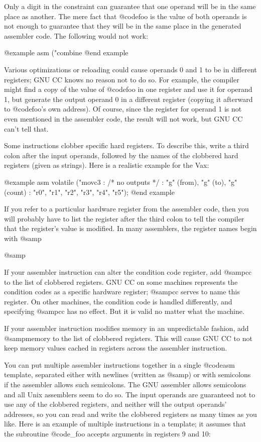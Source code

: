 {Only a digit in the constraint can guarantee that one operand will be in
the same place as another.  The mere fact that @code{foo} is the value of
both operands is not enough to guarantee that they will be in the same
place in the generated assembler code.  The following would not work:

@example
asm ("combine %
@end example

Various optimizations or reloading could cause operands 0 and 1 to be in
different registers; GNU CC knows no reason not to do so.  For example, the
compiler might find a copy of the value of @code{foo} in one register and
use it for operand 1, but generate the output operand 0 in a different
register (copying it afterward to @code{foo}'s own address).  Of course,
since the register for operand 1 is not even mentioned in the assembler
code, the result will not work, but GNU CC can't tell that.

Some instructions clobber specific hard registers.  To describe this, write
a third colon after the input operands, followed by the names of the
clobbered hard registers (given as strings).  Here is a realistic example
for the Vax:

@example
asm volatile ("movc3 %
              : /* no outputs */
              : "g" (from), "g" (to), "g" (count)
              : "r0", "r1", "r2", "r3", "r4", "r5");
@end example

If you refer to a particular hardware register from the assembler code,
then you will probably have to list the register after the third colon
to tell the compiler that the register's value is modified.  In many
assemblers, the register names begin with @samp{%
@samp{%

If your assembler instruction can alter the condition code register,
add @samp{cc} to the list of clobbered registers.  GNU CC on some
machines represents the condition codes as a specific hardware
register; @samp{cc} serves to name this register.  On other machines,
the condition code is handled differently, and specifying @samp{cc}
has no effect.  But it is valid no matter what the machine.

If your assembler instruction modifies memory in an unpredictable
fashion, add @samp{memory} to the list of clobbered registers.
This will cause GNU CC to not keep memory values cached in
registers across the assembler instruction.

You can put multiple assembler instructions together in a single @code{asm}
template, separated either with newlines (written as @samp{\n}) or with
semicolons if the assembler allows such semicolons.  The GNU assembler
allows semicolons and all Unix assemblers seem to do so.  The input
operands are guaranteed not to use any of the clobbered registers, and
neither will the output operands' addresses, so you can read and write the
clobbered registers as many times as you like.  Here is an example of
multiple instructions in a template; it assumes that the subroutine
@code{_foo} accepts arguments in registers 9 and 10:

}}}
